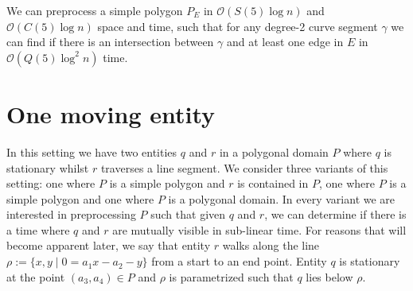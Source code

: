 \documentclass[UKenglish]{lipics-v2019}
\begin{document}
\begin{theorem}
    We can preprocess a simple polygon $P_E$ in $\mathcal{O}(S(5) \log n)$ and $\mathcal{O}(C(5) \log n)$ space and time, such that for any degree-2 curve segment $\gamma$ we can find if there is an intersection between $\gamma$ and at least one edge in $E$ in $\mathcal{O}( Q(5) \log^2 n)$ time. 
\end{theorem}

\section{One moving entity}
\label{sec:pointline}


In this setting we have two entities $q$ and $r$ in a polygonal domain $P$ where $q$ is stationary whilst $r$ traverses a line segment. We consider three variants of this setting: one where $P$ is a simple polygon and $r$ is contained in $P$, one where $P$ is a simple polygon and one where $P$ is a polygonal domain. In every variant we are interested in preprocessing $P$ such that given $q$ and $r$, we can determine if there is a time where $q$ and $r$ are mutually visible in sub-linear time. For reasons that will become apparent later, we say that entity $r$ walks along the line $\rho := \{ x,y \mid  0 = a_1 x - a_2 - y \}$ from a start to an end point. Entity $q$ is stationary at the point $(a_3, a_4) \in P$ and $\rho$ is parametrized such that $q$ lies below $\rho$.
\end{document}
